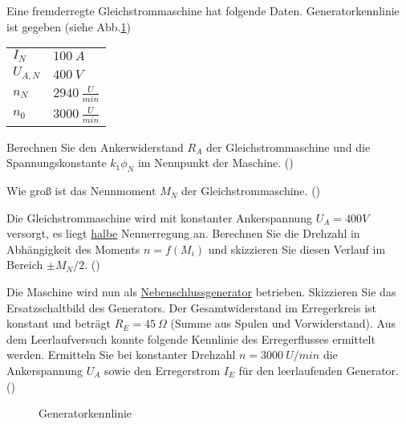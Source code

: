 \begin{question}[section=2,name={23.7.2014},mode=exm,type=bsp,tags={20140723}]
Eine fremderregte Gleichstrommaschine hat folgende Daten. Generatorkennlinie ist gegeben (siehe Abb.\ref{fig:20140723})\\
\begin{tabular}{L{2cm}l}
$I_{N}$ \dotfill &$100~A$\\
$U_{A,N}$ \dotfill & $400~V$ \\
$n_N$ \dotfill & $2940~\frac{U}{min}$\\
$n_0$ \dotfill & $3000~\frac{U}{min}$
\end{tabular}
\begin{compactenum}
\item Berechnen Sie den Ankerwiderstand $R_A$ der Gleichstrommaschine und die Spannungskonstante $k_1 \phi_N$ im Nennpunkt der Maschine. ()
\item Wie groß ist das Nennmoment $M_N$ der Gleichstrommaschine. ()
\item Die Gleichstrommaschine wird mit konstanter Ankerspannung $U_A = 400V$ versorgt, es liegt \underline{halbe} Nennerregung an. Berechnen Sie die Drehzahl in Abhängigkeit des Moments $n=f(M_i)$ und skizzieren Sie diesen Verlauf im Bereich $\pm M_N/2$. ()
\item Die Maschine wird nun als \underline{Nebenschlussgenerator} betrieben. Skizzieren Sie das Ersatzschaltbild des Generators. Der Gesamtwiderstand im Erregerkreis ist konstant und beträgt $R_E = 45~\Omega$ (Summe aus Spulen und Vorwiderstand). Aus dem Leerlaufversuch konnte folgende Kennlinie des Erregerflusses ermittelt werden. Ermitteln Sie bei konstanter Drehzahl $n = 3000 ~U/min$ die Ankerspannung $U_A$ sowie den Erregerstrom $I_E$ für den leerlaufenden Generator. ()
\end{compactenum}
\begin{figure}[H]
\caption{Generatorkennlinie} \label{fig:20140723}
\end{figure}
\end{question}

